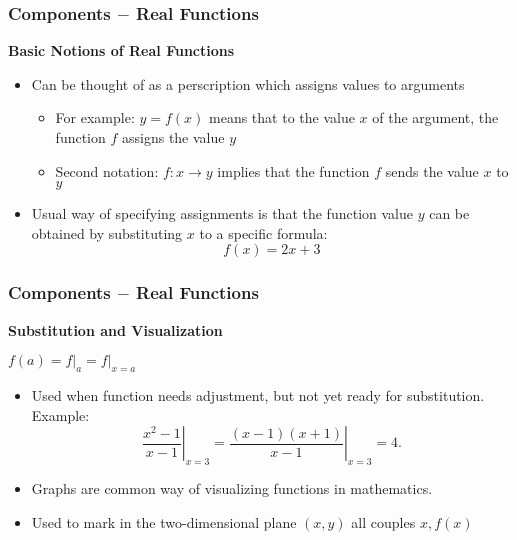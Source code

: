 \documentclass{beamer}
\begin{document}
\begin{frame}[fragile]\frametitle{Components $-$ Real Functions}
\begin{center}\textbf{Basic Notions of Real Functions} \end{center}

\vfill
\begin{itemize}
  \item Can be thought of as a perscription which assigns values to arguments
  \begin{itemize}
    \item For example: $y = f(x)$ means that to the value $x$ of the argument, the function $f$ assigns the value $y$
    \item Second notation: $f:x \to y$ implies that the function $f$ sends the value $x$ to $y$
  \end{itemize}
  \item Usual way of specifying assignments is that the function value $y$ can be obtained by substituting $x$ to a specific formula:
  \begin{equation*}
    f(x) = 2x + 3
  \end{equation*}
  
\end{itemize}

\end{frame}

\begin{frame}[fragile]\frametitle{Components $-$ Real Functions}
\begin{center}\textbf{Substitution and Visualization} \end{center}

\vfill
\begin{center} $f(a) = f \vert_a  =  f \vert_{x=a}$ \end{center}

\vfill
\begin{itemize}
  \item Used when function needs adjustment, but not yet ready for substitution. Example:
  \begin{equation*}
    \left.\frac{x^2 - 1}{x-1}\right\rvert_{x=3} = \left.\frac{(x-1)(x+1)}{x-1}\right\rvert_{x=3} = 4.
  \end{equation*}
  \item Graphs are common way of visualizing functions in mathematics.
  \item Used to mark in the two-dimensional plane $(x,y)$ all couples $x, f(x)$
  
\end{itemize}

\end{frame}
\end{document}
